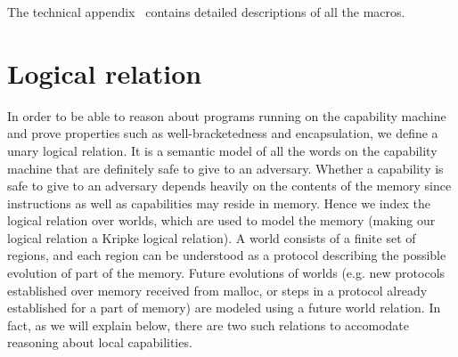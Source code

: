 \documentclass[compsoc,conference,letterpaper,fleqn]{IEEEtran}
\newcommand\lau[1]{{\color{purple} \sf \footnotesize {LS: #1}}\\}
\newcommand\lars[1]{{\color{purple} \sf \footnotesize {LB: #1}}\\}
\begin{document}
The technical appendix~\cite{technical_appendix} contains detailed descriptions
of all the macros.


\section{Logical relation}
\label{sec:logical-relation}
In order to be able to reason about programs running on the capability
machine and prove properties such as well-bracketedness and
encapsulation, we define a unary logical relation.
It is a semantic model of all the words on the capability machine that are
definitely safe to give to an adversary. Whether a capability is safe to give to
an adversary depends heavily on the contents of the memory since instructions as
well as capabilities may reside in memory. Hence we index the logical relation
over worlds, which are used to model the memory (making our logical relation a
Kripke logical relation). A world consists of a finite set of regions, and each
region can be understood as a protocol describing the possible evolution of part
of the memory. Future evolutions of worlds (e.g. new protocols established over
memory received from malloc, or steps in a protocol already established for a
part of memory) are modeled using a future world relation. In fact, as we will
explain below, there are two such relations to accomodate reasoning about local
capabilities.
%
\end{document}
